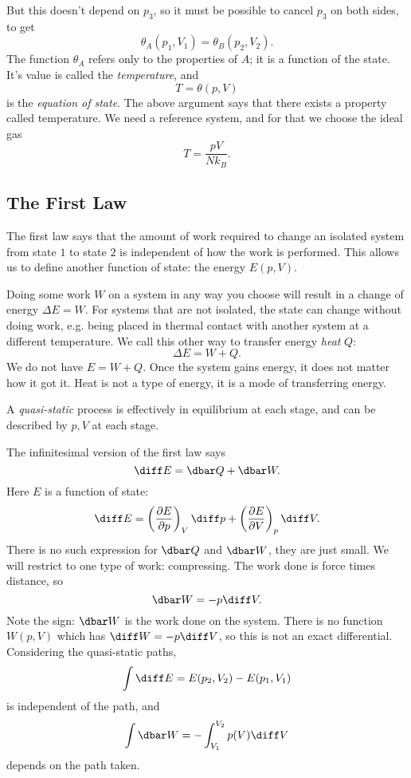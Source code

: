 \documentclass[12pt]{article}
\begin{document}
But this doesn't depend on $p_3$, so it must be possible to cancel $p_3$ on both sides, to get
\[
\theta_A(p_1, V_1) = \theta_B(p_2, V_2).
\]
The function $\theta_A$ refers only to the properties of $A$; it is a function of the state. It's value is called the \emph{temperature}, and
\[
T = \theta(p, V)
\]
is the \emph{equation of state}. The above argument says that there exists a property called temperature. We need a reference system, and for that we choose the ideal gas
\[
T = \frac{pV}{N k_B}.
\]

\subsection{The First Law}
\label{sub:therm_1}

The first law says that the amount of work required to change an isolated system from state $1$ to state $2$ is independent of how the work is performed. This allows us to define another function of state: the energy $E(p, V)$.

Doing some work $W$ on a system in any way you choose will result in a change of energy $\Delta E = W$. For systems that are not isolated, the state can change without doing work, e.g. being placed in thermal contact with another system at a different temperature. We call this other way to transfer energy \emph{heat} $Q$:
\[
\Delta E = W + Q.
\]
We do not have $E = W + Q$. Once the system gains energy, it does not matter how it got it. Heat is not a type of energy, it is a mode of transferring energy.
\begin{definition}
	A \emph{quasi-static} process is effectively in equilibrium at each stage, and can be described by $p, V$ at each stage.
\end{definition}
The infinitesimal version of the first law says
\[
\diff E = \dbar Q + \dbar W.
\]
Here $E$ is a function of state:
\[
\diff E = \left( \frac{\partial E}{\partial p} \right)_V \diff p + \left( \frac{\partial E}{\partial V}\right)_p \diff V.
\]
There is no such expression for $\dbar Q$ and $\dbar W$, they are just small. We will restrict to one type of work: compressing. The work done is force times distance, so
\[
\dbar W = - p \diff V.
\]
Note the sign: $\dbar W$ is the work done on the system. There is no function $W(p, V)$ which has $\diff W = - p \diff V$, so this is not an exact differential. Considering the quasi-static paths,
\[
\int \diff E = E(p_2, V_2) - E(p_1, V_1)
\]
is independent of the path, and
\[
\int \dbar W = - \int_{V_1}^{V_2} p(V) \diff V
\]
depends on the path taken.
\end{document}

